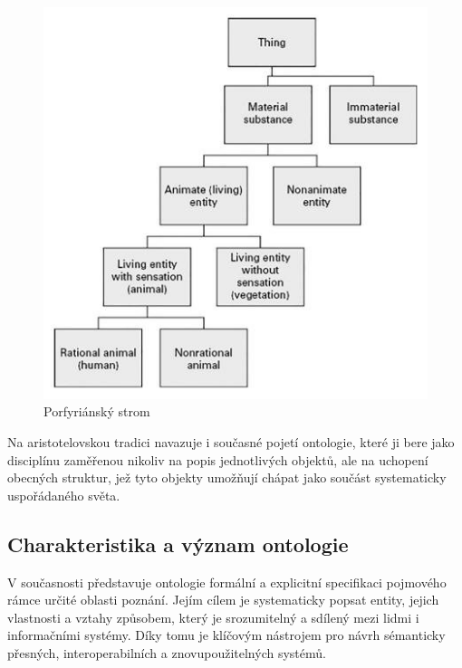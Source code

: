 \begin{figure}[H]
  \centering
  \includegraphics[width=\textwidth]{images/porphyrian_tree.png}
  \caption{Porfyriánský strom \cite{Arp2015}}
  \label{fig:porphyrian_tree}
\end{figure}

Na aristotelovskou tradici navazuje i současné pojetí ontologie, které ji bere jako disciplínu zaměřenou nikoliv na popis jednotlivých objektů, ale na uchopení obecných struktur, jež tyto objekty umožňují chápat jako součást systematicky uspořádaného světa. \cite{Guarino2009}


\subsection{Charakteristika a význam ontologie}
\label{sec:charakteristika-a-význam-ontologie}
V současnosti představuje ontologie formální a explicitní specifikaci pojmového rámce určité oblasti poznání. Jejím cílem je systematicky popsat entity, jejich vlastnosti a vztahy způsobem, který je srozumitelný a sdílený mezi lidmi i informačními systémy. Díky tomu je klíčovým nástrojem pro návrh sémanticky přesných, interoperabilních a znovupoužitelných systémů. \cite{Guarino2009,Pergl2018}

